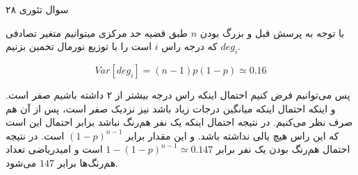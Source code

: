 سوال تئوری ۲۸

با توجه به پرسش قبل و بزرگ بودن 
$n$
طبق قضیه حد مرکزی میتوانیم متغیر تصادفی
$deg_i$
که درجه راس 
$i$
است را با توزیع نورمال تخمین بزنیم.

$$Var[deg_i]=(n-1)p(1-p) \simeq 0.16$$

پس می‌توانیم فرض کنیم احتمال اینکه راس درجه بیشتر از ۲ داشته باشیم صفر است.
و اینکه احتمال اینکه میانگین درجات زیاد باشد نیز نزدیک صفر است، پس از آن هم صرف نظر می‌کنیم.
در نتیجه احتمال اینکه یک نفر هم‌رنگ نباشد برابر احتمال این است که این راس هیچ یالی نداشته باشد.
و این مقدار برابر
$(1-p)^{n-1}$
است.
در نتیجه احتمال هم‌رنگ بودن یک نفر برابر
$1-(1-p)^{n-1} \simeq 0.147$
است و امیدریاضی تعداد هم‌رنگ‌ها برابر 
$147$
می‌شود.